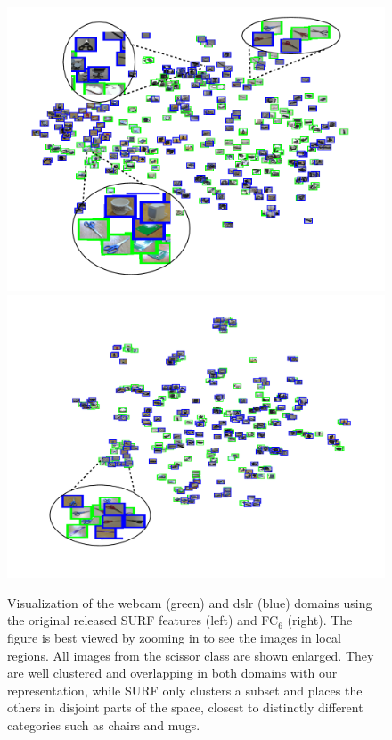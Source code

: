 \newcommand{\soffice}{.3\linewidth}
\begin{figure}
\centering
\includegraphics[height=\soffice]{figs/decaf/surf_webcam_dslr_vis_overlay.png}
\includegraphics[height=\soffice]{figs/decaf/fc6_webcam_dslr_vis_overlay1}
\caption{Visualization of the webcam (green) and dslr (blue) domains using the original released SURF features (left) and FC$_6$ (right). The figure is best viewed by zooming in to see the images in local regions. All images from the scissor class are shown enlarged. They are well clustered and overlapping in both domains with our representation, while SURF only clusters a subset and places the others in disjoint parts of the space, closest to distinctly different categories such as chairs and mugs.}
\label{fig:office_vis}
\end{figure}

